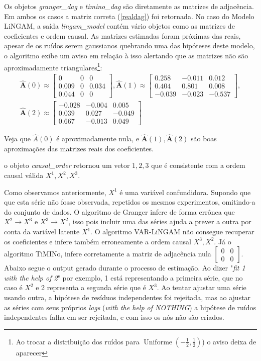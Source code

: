 \documentclass[12pt,letterpaper]{article}
\newcommand{\bd}[1]{\boldsymbol{#1}}
\newcommand{\op}{\operatorname}
\begin{document}
Os objetos \textit{granger\_dag} e \textit{timino\_dag} são diretamente as matrizes de adjacência. Em ambos os casos a matriz correta (\ref{realdag}) foi retornada. No caso do Modelo LiNGAM, a saída \textit{lingam\_model} contém vário objetos como as matrizes de coeficientes e ordem causal. As matrizes estimadas foram próximas das reais, apesar de os ruídos serem gaussianos quebrando uma das hipóteses deste modelo, o algoritmo exibe um aviso em relação à isso alertando que as matrizes não são aproximadamente triangulares\footnote{Ao trocar a distribuição dos ruídos para $\op{Uniforme}(-\frac12,\frac12)$) o aviso deixa de aparecer}:
\begin{align*}
	\hat{\bd A}(0) \approx \begin{bmatrix} 0 & 0 & 0 \\ 0.009 & 0 & 0.034 \\ 0.044 & 0 & 0 \end{bmatrix}, \hat{\bd A}(1)\approx \begin{bmatrix} 0.258 & -0.011 & 0.012 \\ 0.404 & 0.801 & 0.008 \\ -0.039 & -0.023 & -0.537 \end{bmatrix},\\ \hat{\bd A}(2) \approx \begin{bmatrix} -0.028 & -0.004 & 0.005 \\ 0.039 & 0.027 & -0.049 \\ 0.667 & -0.013 & 0.049 \end{bmatrix}
\end{align*}

Veja que $\hat{A}(0)$ é aproximadamente nula, e $\hat{\bd A}(1),\hat{\bd A}(2)$ são boas aproximações das matrizes reais dos coeficientes.

o objeto \textit{causal\_order} retornou um vetor $1,2,3$ que é consistente com a ordem causal válida $X^1,X^2,X^3$. 

Como observamos anteriormente, $X^1$ é uma variável confundidora. Supondo que que esta série não fosse observada, repetidos os mesmos experimentos, omitindo-a do conjunto de dados. O algoritmo de Granger infere de forma errônea que $X^2\to X^3$ e $X^3\to X^2$, isso pois incluir uma das séries ajuda a prever a outra por conta da variável latente $X^1$. O algoritmo VAR-LiNGAM não consegue recuperar os coeficientes e infere também erroneamente a ordem causal $X^3,X^2$. Já o algoritmo TiMINo, infere corretamente a matriz de adjacência nula $\begin{bmatrix}
	0&0\\0&0
\end{bmatrix}$. Abaixo segue o output gerado durante o processo de estimação. Ao dizer "\textit{fit 1 with the help of 2}" por exemplo, 1 está representando a primeira série, que no caso é $X^2$ e 2 representa a segunda série que é $X^3$. Ao tentar ajustar uma série usando outra, a hipótese de resíduos independentes foi rejeitada, mas ao ajustar as séries com seus próprios \textit{lags} (\textit{with the help of NOTHING}) a hipótese de ruídos independentes falha em ser rejeitada, e com isso os nós não são criados.
\end{document}
